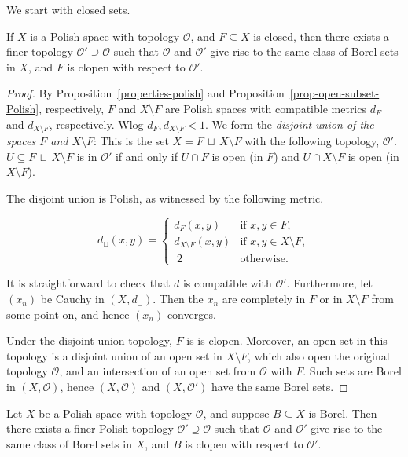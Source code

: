 We start with closed sets.

\begin{lemma}\label{lem-closed-clopen}If $X$ is a Polish space with topology $\mathcal{O}$, and $F \subseteq X$ is closed, then there exists a finer topology $\mathcal{O}' \supseteq \mathcal{O}$ such that $\mathcal{O}$ and $\mathcal{O}'$ give rise to the same class of Borel sets in $X$, and $F$ is clopen with respect to $\mathcal{O}'$.

\end{lemma}\begin{proof}By Proposition~\ref{properties-polish} and Proposition~\ref{prop-open-subset-Polish}, respectively, $F$ and $X \setminus F$ are Polish spaces with compatible metrics $d_F$ and $d_{X\setminus F}$,  respectively. Wlog $d_F, d_{X\setminus F} < 1$. We form the \textit{disjoint union of the spaces $F$ and $X \setminus F$}: This is the set $X = F \,\sqcup\, X \setminus F$ with the following topology, $\mathcal{O}'$. $U \subseteq F \,\sqcup\, X \setminus F$ is in $\mathcal{O}'$ if and only if $U \cap F$ is open (in $F$) and  $U \cap X\setminus F$ is open (in $X\setminus F$).

The disjoint union is Polish, as witnessed by the following metric.

\begin{equation}
d_\sqcup(x,y) =  
    \begin{cases}
            d_F(x,y) &\text{if } x,y \in F, \\
            d_{X\setminus F}(x,y) &\text{if } x,y \in X\setminus F, \\
            \;  2  &\text{otherwise}.
    \end{cases}
\end{equation}

It is straightforward to check that $d$ is compatible with $\mathcal{O}'$. Furthermore, let $(x_n)$ be Cauchy in $(X,d_\sqcup)$. Then the $x_n$ are completely in $F$ or in $X\setminus F$ from some point on, and hence $(x_n)$ converges.

Under the disjoint union topology, $F$ is is clopen. Moreover, an open set in this topology is a disjoint union of an open set in $X\setminus F$, which also open the original topology $\mathcal{O}$, and an intersection of an open set from $\mathcal{O}$ with $F$. Such sets are Borel in $(X,\mathcal{O})$, hence $(X,\mathcal{O})$ and $(X,\mathcal{O}')$ have the same Borel sets.

\end{proof}\begin{theorem}\label{thm-borel-clopen}Let $X$ be a Polish space with topology $\mathcal{O}$, and suppose $B \subseteq X$ is Borel. Then there exists
a finer Polish topology $\mathcal{O}' \supseteq \mathcal{O}$ such that $\mathcal{O}$ and $\mathcal{O}'$ give rise to the same class of Borel sets in $X$, and $B$ is clopen with respect to $\mathcal{O}'$.


\end{theorem}
